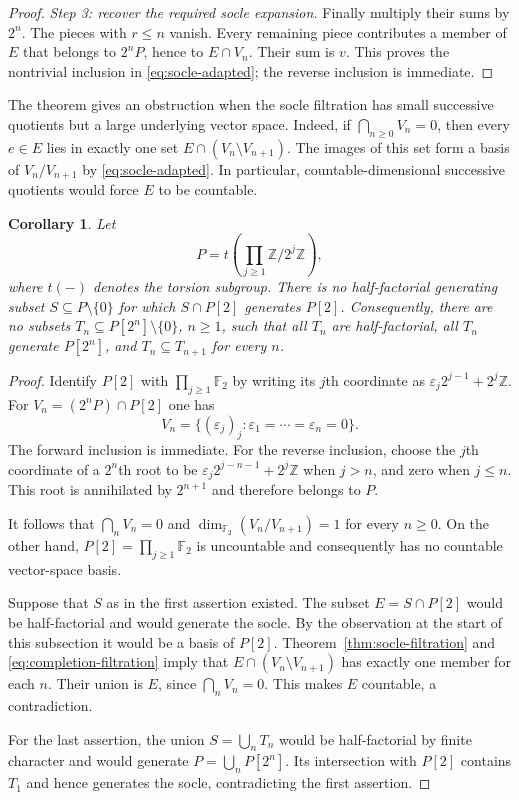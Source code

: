 \documentclass[11pt,reqno]{amsart}
\numberwithin{equation}{section}
\newtheorem{corollary}[theorem]{Corollary}
\theoremstyle{definition}
\theoremstyle{remark}
\newcommand{\Z}{\mathbb Z}
\begin{document}
\begin{proof}
\emph{Step 3: recover the required socle expansion.}
Finally multiply their sums by $2^n$. The pieces with $r\le n$
vanish. Every remaining piece contributes a member of $E$ that
belongs to $2^nP$, hence to $E\cap V_n$. Their sum is $v$.
This proves the nontrivial inclusion in \eqref{eq:socle-adapted};
the reverse inclusion is immediate.
\end{proof}

The theorem gives an obstruction when the socle filtration has
small successive quotients but a large underlying vector space.
Indeed, if $\bigcap_{n\ge0}V_n=0$, then every $e\in E$ lies
in exactly one set $E\cap(V_n\setminus V_{n+1})$. The images
of this set form a basis of $V_n/V_{n+1}$ by
\eqref{eq:socle-adapted}. In particular, countable-dimensional
successive quotients would force $E$ to be countable.

\begin{corollary}\label{cor:no-nested-completion}
Let
\[
 P=t\!\left(\prod_{j\ge1}\Z/2^j\Z\right),
\]
where $t(-)$ denotes the torsion subgroup. There is no
half-factorial generating subset $S\subseteq P\setminus\{0\}$
for which $S\cap P[2]$ generates $P[2]$.
Consequently, there are no subsets
$T_n\subseteq P[2^n]\setminus\{0\}$, $n\ge1$, such that
all $T_n$ are half-factorial, all $T_n$ generate $P[2^n]$, and
$T_n\subseteq T_{n+1}$ for every $n$.
\end{corollary}

\begin{proof}
Identify $P[2]$ with $\prod_{j\ge1}\mathbb F_2$ by writing its
$j$th coordinate as $\varepsilon_j2^{j-1}+2^j\Z$.
For $V_n=(2^nP)\cap P[2]$ one has
\begin{equation}\label{eq:completion-filtration}
 V_n=\{(\varepsilon_j)_j:\varepsilon_1=\cdots=
 \varepsilon_n=0\}.
\end{equation}
The forward inclusion is immediate. For the reverse inclusion,
choose the $j$th coordinate of a $2^n$th root to be
$\varepsilon_j2^{j-n-1}+2^j\Z$ when $j>n$, and zero when
$j\le n$. This root is annihilated by $2^{n+1}$ and therefore
belongs to $P$.

It follows that $\bigcap_nV_n=0$ and
$\dim_{\mathbb F_2}(V_n/V_{n+1})=1$ for every $n\ge0$.
On the other hand, $P[2]=\prod_{j\ge1}\mathbb F_2$ is
uncountable and consequently has no countable vector-space basis.

Suppose that $S$ as in the first assertion existed. The subset
$E=S\cap P[2]$ would be half-factorial and would generate the
socle. By the observation at the start of this subsection it
would be a basis of $P[2]$. Theorem~\ref{thm:socle-filtration}
and \eqref{eq:completion-filtration} imply that
$E\cap(V_n\setminus V_{n+1})$ has exactly one member for each
$n$. Their union is $E$, since $\bigcap_nV_n=0$. This makes
$E$ countable, a contradiction.

For the last assertion, the union $S=\bigcup_nT_n$ would be
half-factorial by finite character and would generate
$P=\bigcup_nP[2^n]$. Its intersection with $P[2]$ contains
$T_1$ and hence generates the socle, contradicting the first
assertion.
\end{proof}
\end{document}
